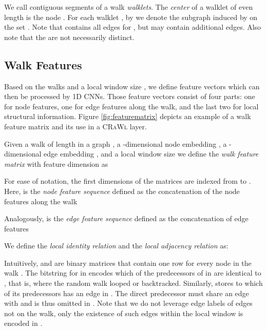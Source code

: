 \documentclass{scrartcl} \usepackage[dvipsnames]{xcolor}
\newcommand{\hwrand}[1]{\todo[color=orange!40,size=\footnotesize]{\textbf{HW:} #1}}
\newcommand{\crawl}{\textsc{CRaWl}}
\begin{document}
    


    
    We call contiguous segments  of a walk  \emph{walklets}. The \emph{center} of a walklet  of even length  is the node . For each walklet , by  we denote the subgraph induced by   on the set . Note that  contains all edges  for , but may contain additional edges. Also note that the  are not necessarily distinct.
    










\subsection{Walk Features}
    \label{WF}
    Based on the walks and a local window size , we define feature vectors which can then be processed by 1D CNNs.
    Those feature vectors consist of four parts: one for node features, one for edge features along the walk, and the last two for local structural information.
Figure \ref{fig:featurematrix} depicts an example of a walk feature matrix and its use in a \crawl{} layer.
    
    Given a walk  of length  in a graph , a -dimensional node embedding , a -dimensional edge embedding , and a local window size  we define the \emph{walk feature matrix}  with feature dimension   as
    
    For ease of notation, the first dimensions of the matrices  are indexed from  to . \hwrand{Indices reparieren}
    Here,  is the \emph{node feature sequence} defined as the concatenation of the node features along the walk
    
    Analogously,  is the \emph{edge feature sequence}  defined as the concatenation of edge features 
    
    We define the \emph{local identity relation}  and the \emph{local adjacency relation}  as:
    

    Intuitively,  and  are binary matrices that contain one row for every node  in the walk .
    The bitstring for  in  encodes which of the  predecessors of  in  are identical to , that is, where the random walk looped or backtracked.
    Similarly,  stores to which of its predecessors  has an edge in .
    The direct predecessor  must share an edge with  and is thus omitted in .
    Note that we do not leverage edge labels of edges not on the walk, only the existence of such edges within the local window is encoded in .
    
\end{document}
